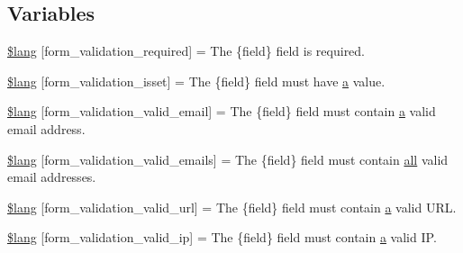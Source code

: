 \subsection*{Variables}
\begin{DoxyCompactItemize}
\item 
\hyperlink{_admin_2system_2language_2english_2form__validation__lang_8php_a2335c24e2213207c5dda58ec093673a9}{\$lang} \mbox{[}\textquotesingle{}form\+\_\+validation\+\_\+required\textquotesingle{}\mbox{]} = \textquotesingle{}The \{field\} field is required.\textquotesingle{}
\item 
\hyperlink{_admin_2system_2language_2english_2form__validation__lang_8php_a941575e651258a5a17341aca4e587898}{\$lang} \mbox{[}\textquotesingle{}form\+\_\+validation\+\_\+isset\textquotesingle{}\mbox{]} = \textquotesingle{}The \{field\} field must have \hyperlink{_admin_2assets_2js_2bootstrap_8min_8js_a1f5870dcf487187f13d5fd328ed9e6e7}{a} value.\textquotesingle{}
\item 
\hyperlink{_admin_2system_2language_2english_2form__validation__lang_8php_a652d5be4d397dcac4407294c2436af34}{\$lang} \mbox{[}\textquotesingle{}form\+\_\+validation\+\_\+valid\+\_\+email\textquotesingle{}\mbox{]} = \textquotesingle{}The \{field\} field must contain \hyperlink{_admin_2assets_2js_2bootstrap_8min_8js_a1f5870dcf487187f13d5fd328ed9e6e7}{a} valid email address.\textquotesingle{}
\item 
\hyperlink{_admin_2system_2language_2english_2form__validation__lang_8php_af9ec234a36f18a91c981985c3db4333e}{\$lang} \mbox{[}\textquotesingle{}form\+\_\+validation\+\_\+valid\+\_\+emails\textquotesingle{}\mbox{]} = \textquotesingle{}The \{field\} field must contain \hyperlink{change_team_8php_a5f3fcf87333f5770d16608f67ad88d19}{all} valid email addresses.\textquotesingle{}
\item 
\hyperlink{_admin_2system_2language_2english_2form__validation__lang_8php_af9467e9ed3767f5bff205b79d706fe0a}{\$lang} \mbox{[}\textquotesingle{}form\+\_\+validation\+\_\+valid\+\_\+url\textquotesingle{}\mbox{]} = \textquotesingle{}The \{field\} field must contain \hyperlink{_admin_2assets_2js_2bootstrap_8min_8js_a1f5870dcf487187f13d5fd328ed9e6e7}{a} valid U\+R\+L.\textquotesingle{}
\item 
\hyperlink{_admin_2system_2language_2english_2form__validation__lang_8php_a8d9bfb49825972af0deee31f8f9dccf2}{\$lang} \mbox{[}\textquotesingle{}form\+\_\+validation\+\_\+valid\+\_\+ip\textquotesingle{}\mbox{]} = \textquotesingle{}The \{field\} field must contain \hyperlink{_admin_2assets_2js_2bootstrap_8min_8js_a1f5870dcf487187f13d5fd328ed9e6e7}{a} valid I\+P.\textquotesingle{}

\end{DoxyCompactItemize}
